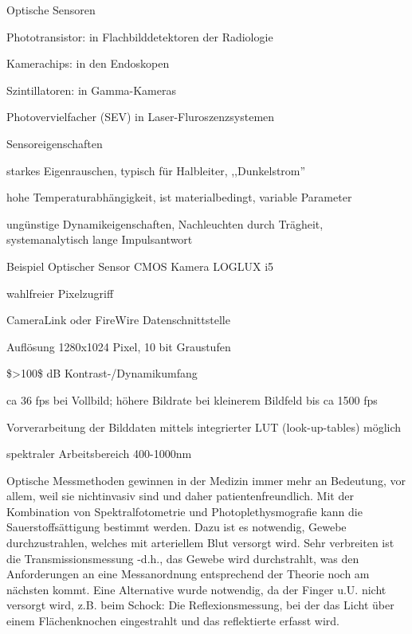 \documentclass[a4paper]{article}
\begin{document}
\begin{multicols}{3}
  Optische Sensoren

  \begin{itemize*}
    \item Phototransistor: in Flachbilddetektoren der Radiologie
    \item Kamerachips: in den Endoskopen
    \item Szintillatoren: in Gamma-Kameras
    \item Photovervielfacher (SEV) in Laser-Fluroszenzsystemen
  \end{itemize*}

  Sensoreigenschaften

  \begin{itemize*}
    \item starkes Eigenrauschen, typisch für Halbleiter, ,,Dunkelstrom''
    \item hohe Temperaturabhängigkeit, ist materialbedingt, variable Parameter
    \item ungünstige Dynamikeigenschaften, Nachleuchten durch Trägheit, systemanalytisch lange Impulsantwort
  \end{itemize*}

  Beispiel Optischer Sensor CMOS Kamera LOGLUX i5

  \begin{itemize*}
    \item wahlfreier Pixelzugriff
    \item CameraLink oder FireWire Datenschnittstelle
    \item Auflösung 1280x1024 Pixel, 10 bit Graustufen
    \item \$\textgreater100\$ dB Kontrast-/Dynamikumfang
    \item ca 36 fps bei Vollbild; höhere Bildrate bei kleinerem Bildfeld bis ca 1500 fps
    \item Vorverarbeitung der Bilddaten mittels integrierter LUT (look-up-tables) möglich
    \item spektraler Arbeitsbereich 400-1000nm
  \end{itemize*}

  Optische Messmethoden gewinnen in der Medizin immer mehr an Bedeutung,
  vor allem, weil sie nichtinvasiv sind und daher patientenfreundlich. Mit
  der Kombination von Spektralfotometrie und Photoplethysmografie kann die
  Sauerstoffsättigung bestimmt werden. Dazu ist es notwendig, Gewebe
  durchzustrahlen, welches mit arteriellem Blut versorgt wird. Sehr
  verbreiten ist die Transmissionsmessung -d.h., das Gewebe wird
  durchstrahlt, was den Anforderungen an eine Messanordnung entsprechend
  der Theorie noch am nächsten kommt. Eine Alternative wurde notwendig, da
  der Finger u.U. nicht versorgt wird, z.B. beim Schock: Die
  Reflexionsmessung, bei der das Licht über einem Flächenknochen
  eingestrahlt und das reflektierte erfasst wird.


\end{multicols}
\end{document}
